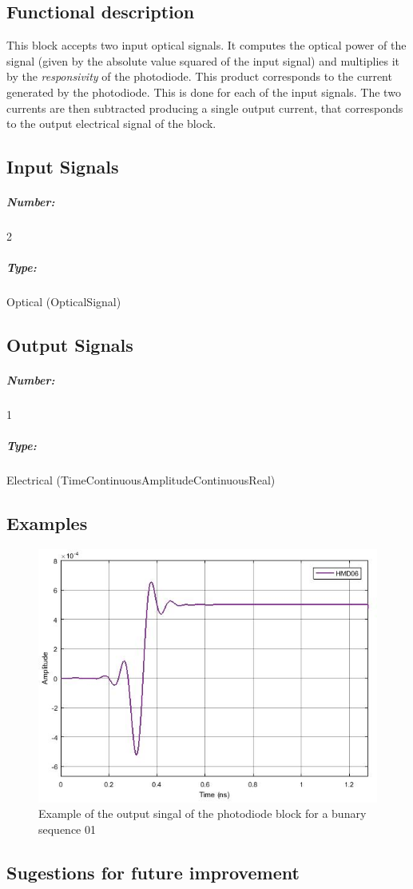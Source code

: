 \subsection*{Functional description}

This block accepts two input optical signals. It computes the optical power of the signal (given by the absolute value squared of the input signal) and multiplies it by the \textit{responsivity} of the photodiode. This product corresponds to the current generated by the photodiode. This is done for each of the input signals. The two currents are then subtracted producing a single output current, that corresponds to the output electrical signal of the block.

\pagebreak

\subsection*{Input Signals}

\subparagraph*{Number:} 2

\subparagraph*{Type:} Optical (OpticalSignal)

\subsection*{Output Signals}

\subparagraph*{Number:} 1

\subparagraph*{Type:} Electrical (TimeContinuousAmplitudeContinuousReal)

\subsection*{Examples} 

\begin{figure}[h]
	\centering
	\includegraphics[width=\textwidth]{../homodyne_receiver/figures/Photodiode_output}
	\caption{Example of the output singal of the photodiode block for a bunary sequence 01}\label{Photodiode_output}
\end{figure}

\subsection*{Sugestions for future improvement}


